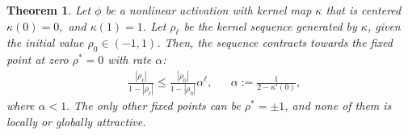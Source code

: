 \documentclass[twoside]{article}
\newcommand{\E}{\mathbb{E}\,}
\newcommand{\he}{\mathrm{he}}
\newtheorem{theorem}{Theorem}
\theoremstyle{definition}
\newcommand{\thomas}[1]{{\color{blue}\textit{#1}}}
\begin{document}
\begin{theorem}\label{thm:global_attract_centered}
Let $\phi$ be a nonlinear activation with kernel map $\kappa$ that is centered $\kappa(0)=0,$ and $\kappa(1)=1$. 
Let $\rho_\ell$ be the kernel sequence generated by $\kappa$, given the initial value $\rho_0 \in(-1 , 1)$.
Then, the sequence contracts towards the fixed point at zero $\rho^*=0$ with rate $\alpha$:
    \begin{align}
        &\frac{|\rho_\ell|}{1-|\rho_\ell|} \le \frac{|\rho_0|}{1-|\rho_0|}\alpha^{\ell}, && \alpha := \frac{1}{2-\kappa'(0)},
    \end{align}
 where $\alpha<1.$ The only other fixed points can be $\rho^*=\pm 1$, and none of them is locally or globally attractive.
\end{theorem}



\end{document}
